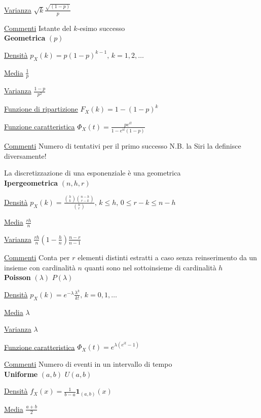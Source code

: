 \documentclass[openany]{book} %
\begin{document}
\begin{multicols}{2}
	\underline{Varianza} $\sqrt{k}\frac{\sqrt{(1-p)}}{p}$

	\underline{Commenti} Istante del $k$-esimo successo
	\\

	\textbf{Geometrica} $(p)$

	\underline{Densità} $p_X(k) = p(1-p)^{k-1}, \, k =1,2,\dots$

	\underline{Media} $\frac{1}{p}$

	\underline{Varianza} $\frac{1-p}{p^2}$

	\underline{Funzione di ripartizione} $F_X(k)=1-(1-p)^k$

	\underline{Funzione caratteristica} $\Phi_X(t)= \frac{pe^{it}}{1-e^{it}(1-p)}$

	\underline{Commenti} Numero di tentativi per il primo successo N.B. la Siri la definisce diversamente!

	La discretizzazione di una esponenziale è una geometrica
	\\

	\textbf{Ipergeometrica} $(n,h,r)$

	\underline{Densità} $p_X(k) = \frac{\binom {h}{k}\binom {n-h}{r-k}}{\binom {n}{r}},\,k\leq h,\,0\leq r-k\leq n-h$

	\underline{Media} $\frac{rh}{n}$

	\underline{Varianza} $\frac{rh}{n}\left(1-\frac{h}{n}\right)\frac{n-r}{n-1}$

	\underline{Commenti} Conta per $r$ elementi distinti estratti a caso senza reinserimento da un insieme con cardinalità $n$ quanti sono nel sottoinsieme di cardinalità $h$
	\\

	\textbf{Poisson} $(\lambda)$ \quad $P(\lambda)$

	\underline{Densità} $p_X(k) = e^{-\lambda}\frac{\lambda^k}{k!},\,k=0,1,\dots$

	\underline{Media} $\lambda$

	\underline{Varianza} $\lambda$

	\underline{Funzione caratteristica} $\Phi_X(t)=e^{\lambda(e^{it}-1)}$

	\underline{Commenti} Numero di eventi in un intervallo di tempo
	\\

	\textbf{Uniforme} $(a,b)$ \quad $U(a,b)$

	\underline{Densità} $f_X(x) = \frac{1}{b-a}\boldsymbol{1}_{(a,b)}(x)$

	\underline{Media} $\frac{a+b}{2}$


\end{multicols}
\end{document}
